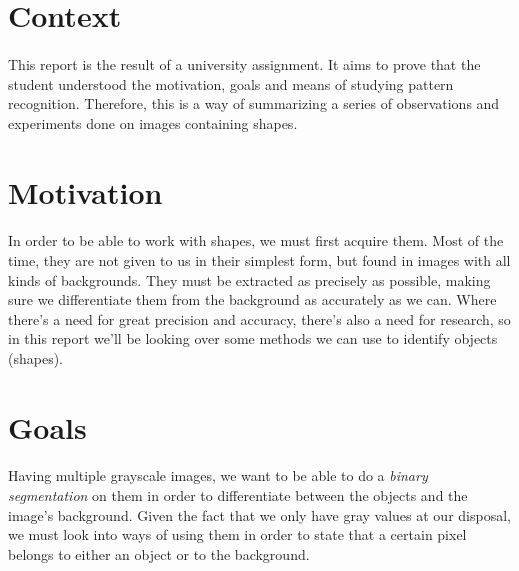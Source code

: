 \section{Context}
\paragraph{}
This report is the result of a university assignment.
It aims to prove that the student understood the motivation, goals and means of studying pattern recognition.
Therefore, this is a way of summarizing a series of observations and experiments done on images containing shapes.

\section{Motivation}
\paragraph{}
In order to be able to work with shapes, we must first acquire them.
Most of the time, they are not given to us in their simplest form, but found in images with all kinds of backgrounds.
They must be extracted as precisely as possible, making sure we differentiate them from the background as accurately as we can.
Where there's a need for great precision and accuracy, there's also a need for research, so in this report we'll be looking over some methods we can use to identify objects (shapes).

\section{Goals}
\paragraph{}
Having multiple grayscale images, we want to be able to do a \emph{binary segmentation} on them in order to differentiate between the objects and the image's background.
Given the fact that we only have gray values at our disposal, we must look into ways of using them in order to state that a certain pixel belongs to either an object or to the background.
